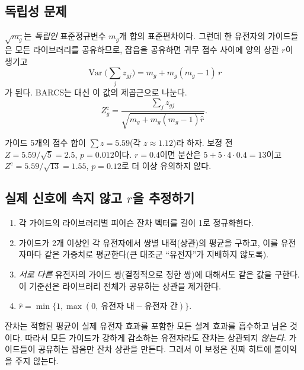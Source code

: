 \documentclass[11pt]{article}
\newcommand{\Var}{\operatorname{Var}}
\begin{document}
\subsection{독립성 문제}

$\sqrt{m_g}$는 \emph{독립인} 표준정규변수 $m_g$개 합의 표준편차이다. 그런데 한
유전자의 가이드들은 모든 라이브러리를 공유하므로, 잡음을 공유하면 귀무 점수
사이에 양의 상관 $r$이 생기고
\begin{equation}
\Var\Big(\sum_j z_{gj}\Big)=m_g+m_g(m_g-1)\,r
\end{equation}
가 된다. BARCS는 대신 이 값의 제곱근으로 나눈다.
\begin{equation}
Z_g^{\text{c}}=\frac{\sum_{j}z_{gj}}{\sqrt{m_g+m_g(m_g-1)\hat r}} .
\end{equation}

\begin{example}[: 상관이 하는 일]
가이드 5개의 점수 합이 $\sum z=5.59$(각 $z\approx1.12$)라 하자. 보정 전
$Z=5.59/\sqrt5=2.5$, $p=0.012$이다. $r=0.4$이면 분산은
$5+5\cdot4\cdot0.4=13$이고 $Z^{\text{c}}=5.59/\sqrt{13}=1.55$, $p=0.12$로
더 이상 유의하지 않다.
\end{example}

\subsection{실제 신호에 속지 않고 $r$을 추정하기}

\begin{enumerate}[itemsep=2pt]
\item 각 가이드의 라이브러리별 피어슨 잔차 벡터를 길이 1로 정규화한다.
\item 가이드가 2개 이상인 각 유전자에서 쌍별 내적(상관)의 평균을 구하고, 이를
유전자마다 같은 가중치로 평균한다(큰 대조군 ``유전자''가 지배하지 않도록).
\item \emph{서로 다른} 유전자의 가이드 쌍(결정적으로 정한 쌍)에 대해서도 같은
값을 구한다. 이 기준선은 라이브러리 전체가 공유하는 상관을 제거한다.
\item $\hat r=\min\{1,\max(0,\ \text{유전자 내}-\text{유전자 간})\}$.
\end{enumerate}

\begin{keyidea}
잔차는 적합된 평균이 실제 유전자 효과를 포함한 모든 설계 효과를 흡수하고 남은
것이다. 따라서 모든 가이드가 강하게 감소하는 유전자라도 잔차는 상관되지
\emph{않는다}. 가이드들이 공유하는 잡음만 잔차 상관을 만든다. 그래서 이 보정은
진짜 히트에 불이익을 주지 않는다.
\end{keyidea}
\end{document}
